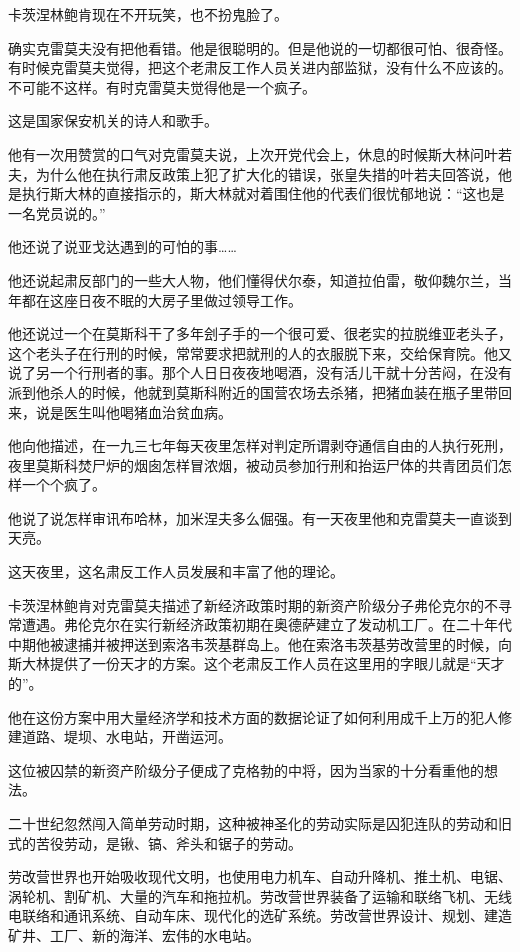 卡茨涅林鲍肯现在不开玩笑，也不扮鬼脸了。

确实克雷莫夫没有把他看错。他是很聪明的。但是他说的一切都很可怕、很奇怪。有时候克雷莫夫觉得，把这个老肃反工作人员关进内部监狱，没有什么不应该的。不可能不这样。有时克雷莫夫觉得他是一个疯子。

这是国家保安机关的诗人和歌手。

他有一次用赞赏的口气对克雷莫夫说，上次开党代会上，休息的时候斯大林问叶若夫，为什么他在执行肃反政策上犯了扩大化的错误，张皇失措的叶若夫回答说，他是执行斯大林的直接指示的，斯大林就对着围住他的代表们很忧郁地说：“这也是一名党员说的。”

他还说了说亚戈达遇到的可怕的事……

他还说起肃反部门的一些大人物，他们懂得伏尔泰，知道拉伯雷，敬仰魏尔兰，当年都在这座日夜不眠的大房子里做过领导工作。

他还说过一个在莫斯科干了多年刽子手的一个很可爱、很老实的拉脱维亚老头子，这个老头子在行刑的时候，常常要求把就刑的人的衣服脱下来，交给保育院。他又说了另一个行刑者的事。那个人日日夜夜地喝酒，没有活儿干就十分苦闷，在没有派到他杀人的时候，他就到莫斯科附近的国营农场去杀猪，把猪血装在瓶子里带回来，说是医生叫他喝猪血治贫血病。

他向他描述，在一九三七年每天夜里怎样对判定所谓剥夺通信自由的人执行死刑，夜里莫斯科焚尸炉的烟囱怎样冒浓烟，被动员参加行刑和抬运尸体的共青团员们怎样一个个疯了。

他说了说怎样审讯布哈林，加米涅夫多么倔强。有一天夜里他和克雷莫夫一直谈到天亮。

这天夜里，这名肃反工作人员发展和丰富了他的理论。

卡茨涅林鲍肯对克雷莫夫描述了新经济政策时期的新资产阶级分子弗伦克尔的不寻常遭遇。弗伦克尔在实行新经济政策初期在奥德萨建立了发动机工厂。在二十年代中期他被逮捕并被押送到索洛韦茨基群岛上。他在索洛韦茨基劳改营里的时候，向斯大林提供了一份天才的方案。这个老肃反工作人员在这里用的字眼儿就是“天才的”。

他在这份方案中用大量经济学和技术方面的数据论证了如何利用成千上万的犯人修建道路、堤坝、水电站，开凿运河。

这位被囚禁的新资产阶级分子便成了克格勃的中将，因为当家的十分看重他的想法。

二十世纪忽然闯入简单劳动时期，这种被神圣化的劳动实际是囚犯连队的劳动和旧式的苦役劳动，是锹、镐、斧头和锯子的劳动。

劳改营世界也开始吸收现代文明，也使用电力机车、自动升降机、推土机、电锯、涡轮机、割矿机、大量的汽车和拖拉机。劳改营世界装备了运输和联络飞机、无线电联络和通讯系统、自动车床、现代化的选矿系统。劳改营世界设计、规划、建造矿井、工厂、新的海洋、宏伟的水电站。

